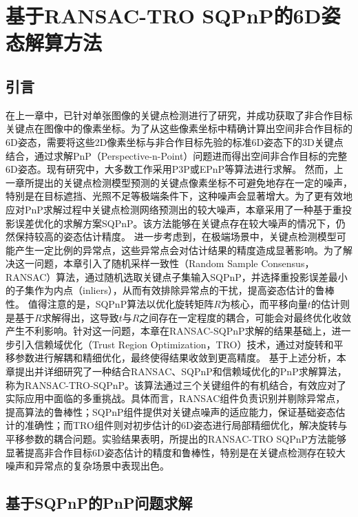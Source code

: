 \chapter{基于RANSAC-TRO SQPnP的6D姿态解算方法}
\label{chap:RANSAC-TRO-SQPnP}

\section{引言}
\label{sec:RANSAC-TRO-SQPnP:intro}
在上一章中，已针对单张图像的关键点检测进行了研究，并成功获取了非合作目标关键点在图像中的像素坐标。为了从这些像素坐标中精确计算出空间非合作目标的6D姿态，需要将这些2D像素坐标与非合作目标先验的标准6D姿态下的3D关键点结合，通过求解PnP（Perspective-n-Point）问题进而得出空间非合作目标的完整6D姿态。现有研究中，大多数工作采用P3P\cite{chen2019satellite,s22218541,Guo_2022}或EPnP\cite{li2022learning,huan2020pose,lotti2022investigating}等算法进行求解。
然而，上一章所提出的关键点检测模型预测的关键点像素坐标不可避免地存在一定的噪声，特别是在目标遮挡、光照不足等极端条件下，这种噪声会显著增大。为了更有效地应对PnP求解过程中关键点检测网络预测出的较大噪声，本章采用了一种基于重投影误差优化的求解方案SQPnP\cite{terzakis2020consistently}。该方法能够在关键点存在较大噪声的情况下，仍然保持较高的姿态估计精度。
进一步考虑到，在极端场景中，关键点检测模型可能产生一定比例的异常点，这些异常点会对估计结果的精度造成显著影响。为了解决这一问题，本章引入了随机采样一致性（Random Sample Consensus，RANSAC）算法，通过随机选取关键点子集输入SQPnP，并选择重投影误差最小的子集作为内点（inliers），从而有效排除异常点的干扰，提高姿态估计的鲁棒性。
值得注意的是，SQPnP算法以优化旋转矩阵$R$为核心，而平移向量$t$的估计则是基于$R$求解得出，这导致$t$与$R$之间存在一定程度的耦合，可能会对最终优化收敛产生不利影响。针对这一问题，本章在RANSAC-SQPnP求解的结果基础上，进一步引入信赖域优化（Trust Region Optimization，TRO）技术，通过对旋转和平移参数进行解耦和精细优化，最终使得结果收敛到更高精度。
基于上述分析，本章提出并详细研究了一种结合RANSAC、SQPnP和信赖域优化的PnP求解算法，称为RANSAC-TRO-SQPnP。该算法通过三个关键组件的有机结合，有效应对了实际应用中面临的多重挑战。具体而言，RANSAC组件负责识别并剔除异常点，提高算法的鲁棒性；SQPnP组件提供对关键点噪声的适应能力，保证基础姿态估计的准确性；而TRO组件则对初步估计的6D姿态进行局部精细优化，解决旋转与平移参数的耦合问题。实验结果表明，所提出的RANSAC-TRO SQPnP方法能够显著提高非合作目标6D姿态估计的精度和鲁棒性，特别是在关键点检测存在较大噪声和异常点的复杂场景中表现出色。


\section{基于SQPnP的PnP问题求解}
\label{sec:RANSAC-TRO-SQPnP:SQPnP}
\vspace{1ex}


